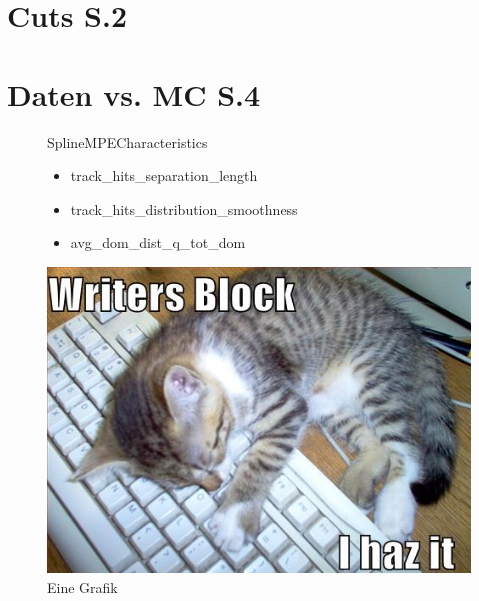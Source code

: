 \section{Cuts S.2}
\section{Daten vs. MC S.4}

\newcommand{\nextitem}{\par\hspace*{\labelsep}\textbullet\hspace*{\labelsep}}

\begin{figure}[htbp]
	\begin{minipage}{0.5\textwidth} 
	SplineMPECharacteristics
	\begin{itemize}
\item track\_hits\_separation\_length
\item track\_hits\_distribution\_smoothness
\item avg\_dom\_dist\_q\_tot\_dom \\
	\end{itemize}

	\end{minipage}
	\begin{minipage}{0.5\textwidth}
	\includegraphics[width=\textwidth]{./Plots/dummy.png}
	\caption{Eine Grafik}
	\label{Bild} 
	\end{minipage}
\end{figure}

